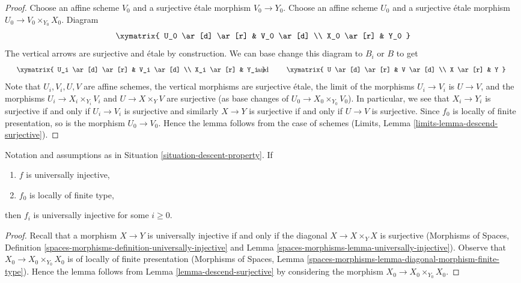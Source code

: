 \begin{proof}
Choose an affine scheme $V_0$ and a surjective \'etale morphism
$V_0 \to Y_0$. Choose an affine scheme $U_0$ and a surjective \'etale
morphism $U_0 \to V_0 \times_{Y_0} X_0$. Diagram
$$
\xymatrix{
U_0 \ar[d] \ar[r] & V_0 \ar[d] \\
X_0 \ar[r] & Y_0
}
$$
The vertical arrows are surjective and \'etale by construction.
We can base change this diagram to $B_i$ or $B$ to get
$$
\vcenter{
\xymatrix{
U_i \ar[d] \ar[r] & V_i \ar[d] \\
X_i \ar[r] & Y_i
}
}
\quad\text{and}\quad
\vcenter{
\xymatrix{
U \ar[d] \ar[r] & V \ar[d] \\
X \ar[r] & Y
}
}
$$
Note that $U_i, V_i, U, V$ are affine schemes, the vertical morphisms are
surjective \'etale, the limit of the morphisms $U_i \to V_i$ is $U \to V$,
and the morphisms $U_i \to X_i \times_{Y_i} V_i$ and
$U \to X \times_Y V$ are surjective (as base changes of
$U_0 \to X_0 \times_{Y_0} V_0$). In particular, we see that
$X_i \to Y_i$ is surjective if and only if $U_i \to V_i$ is surjective
and similarly $X \to Y$ is surjective if and only if $U \to V$ is surjective.
Since $f_0$ is locally of finite
presentation, so is the morphism $U_0 \to V_0$. Hence the lemma follows
from the case of schemes (Limits, Lemma \ref{limits-lemma-descend-surjective}).
\end{proof}

\begin{lemma}
\label{lemma-descend-universally-injective}
Notation and assumptions as in Situation \ref{situation-descent-property}. If
\begin{enumerate}
\item $f$ is universally injective,
\item $f_0$ is locally of finite type,
\end{enumerate}
then $f_i$ is universally injective for some $i \geq 0$.
\end{lemma}

\begin{proof}
Recall that a morphism $X \to Y$ is universally injective if and
only if the diagonal $X \to X \times_Y X$ is surjective
(Morphisms of Spaces, Definition
\ref{spaces-morphisms-definition-universally-injective} and
Lemma \ref{spaces-morphisms-lemma-universally-injective}).
Observe that $X_0 \to X_0 \times_{Y_0} X_0$ is of locally of finite
presentation (Morphisms of Spaces, Lemma
\ref{spaces-morphisms-lemma-diagonal-morphism-finite-type}).
Hence the lemma follows from Lemma \ref{lemma-descend-surjective}
by considering the morphism $X_0 \to X_0 \times_{Y_0} X_0$.
\end{proof}

